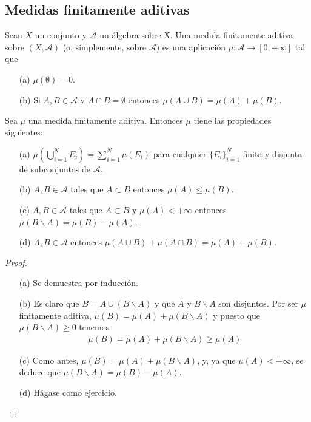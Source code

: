\subsection{Medidas finitamente aditivas}
\begin{defi}
    Sean $X$ un conjunto y $\mathcal{A}$ un álgebra sobre X. Una medida finitamente aditiva sobre $(X, \mathcal{A})$ (o, simplemente, sobre $\mathcal{A}$) es una aplicación $\mu : \mathcal{A} \longrightarrow [0, +\infty]$ tal que
    \begin{enumerate}
        \item[(a)] $\mu (\emptyset) = 0$.
        \item[(b)] Si $A, B \in \mathcal{A}$ y $A \cap B = \emptyset$ entonces $\mu(A \cup B) = \mu(A) + \mu(B)$.
    \end{enumerate}
\end{defi}
\begin{prop}
    Sea $\mu$ una medida finitamente aditiva. Entonces $\mu$ tiene las propiedades siguientes:
    \begin{enumerate}
        \item[(a)] $\mu \left(\bigcup_{i=1}^{N}{E_i} \right) = \sum_{i=1}^{N} \mu(E_i)$ para cualquier $\{ E_i \}_{i=1}^{N}$ finita y disjunta de subconjuntos de $\mathcal{A}$.
        \item[(b)] $A, B \in \mathcal{A}$ tales que $A \subset B$ entonces $\mu(A) \leq \mu(B)$.
        \item[(c)] $A, B \in \mathcal{A}$ tales que $A \subset B$ y $\mu(A) < +\infty$ entonces $\mu(B \backslash A) = \mu(B) - \mu(A)$.
        \item[(d)] $A, B \in \mathcal{A}$ entonces $\mu(A \cup B) + \mu(A \cap B) = \mu(A) + \mu(B)$.
    \end{enumerate}
\end{prop}
\begin{proof}
    \begin{enumerate}
        \item[(a)] Se demuestra por inducción.
        \item[(b)] Es claro que $B = A \cup (B \backslash A)$ y que $A$ y $B \backslash A$ son disjuntos. Por ser $\mu$ finitamente aditiva, $\mu(B) = \mu(A) + \mu(B \backslash A)$ y puesto que $\mu(B \backslash A) \ge 0$ tenemos
              \begin{align*}
                  \mu(B) = \mu(A) + \mu(B \backslash A) \ge \mu(A)
              \end{align*}
        \item[(c)] Como antes, $\mu(B) = \mu(A) + \mu(B \backslash A)$, y, ya que $\mu(A) < +\infty$, se deduce que $\mu(B \backslash A) = \mu(B) - \mu(A)$.
        \item[(d)] Hágase como ejercicio.
    \end{enumerate}
\end{proof}

